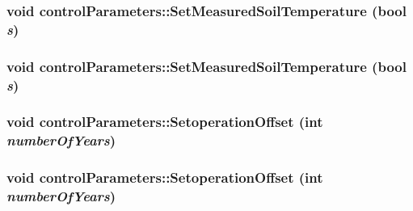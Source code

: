 \label{classcontrol_parameters_a41e0a4ebe351184ecebbdb62664a0ff4}
\hypertarget{classcontrol_parameters_a267ebd9b1c69e4cba12fdbe9d4fb4ac6}{
\subsubsection[{SetMeasuredSoilTemperature}]{\setlength{\rightskip}{0pt plus 5cm}void controlParameters::SetMeasuredSoilTemperature (bool {\em s})}}
\label{classcontrol_parameters_a267ebd9b1c69e4cba12fdbe9d4fb4ac6}
\hypertarget{classcontrol_parameters_a267ebd9b1c69e4cba12fdbe9d4fb4ac6}{
\subsubsection[{SetMeasuredSoilTemperature}]{\setlength{\rightskip}{0pt plus 5cm}void controlParameters::SetMeasuredSoilTemperature (bool {\em s})}}
\label{classcontrol_parameters_a267ebd9b1c69e4cba12fdbe9d4fb4ac6}
\hypertarget{classcontrol_parameters_a020ac9a97ec3af51bb2a921810a7cfcd}{
\subsubsection[{SetoperationOffset}]{\setlength{\rightskip}{0pt plus 5cm}void controlParameters::SetoperationOffset (int {\em numberOfYears})}}
\label{classcontrol_parameters_a020ac9a97ec3af51bb2a921810a7cfcd}
\hypertarget{classcontrol_parameters_a020ac9a97ec3af51bb2a921810a7cfcd}{
\subsubsection[{SetoperationOffset}]{\setlength{\rightskip}{0pt plus 5cm}void controlParameters::SetoperationOffset (int {\em numberOfYears})}}
